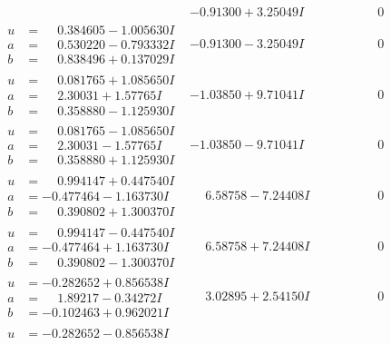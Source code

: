 \documentclass[1p]{elsarticle_modified}
\theoremstyle{definition}
\begin{document}
$$\begin{array}{c|c|c}
 & -0.91300 + 3.25049 I & \phantom{-0.000000 } 0 \\ \hline\begin{aligned}
u &= \phantom{-}0.384605 - 1.005630 I \\
a &= \phantom{-}0.530220 - 0.793332 I \\
b &= \phantom{-}0.838496 + 0.137029 I\end{aligned}
 & -0.91300 - 3.25049 I & \phantom{-0.000000 } 0 \\ \hline\begin{aligned}
u &= \phantom{-}0.081765 + 1.085650 I \\
a &= \phantom{-}2.30031 + 1.57765 I \\
b &= \phantom{-}0.358880 - 1.125930 I\end{aligned}
 & -1.03850 + 9.71041 I & \phantom{-0.000000 } 0 \\ \hline\begin{aligned}
u &= \phantom{-}0.081765 - 1.085650 I \\
a &= \phantom{-}2.30031 - 1.57765 I \\
b &= \phantom{-}0.358880 + 1.125930 I\end{aligned}
 & -1.03850 - 9.71041 I & \phantom{-0.000000 } 0 \\ \hline\begin{aligned}
u &= \phantom{-}0.994147 + 0.447540 I \\
a &= -0.477464 - 1.163730 I \\
b &= \phantom{-}0.390802 + 1.300370 I\end{aligned}
 & \phantom{-}6.58758 - 7.24408 I & \phantom{-0.000000 } 0 \\ \hline\begin{aligned}
u &= \phantom{-}0.994147 - 0.447540 I \\
a &= -0.477464 + 1.163730 I \\
b &= \phantom{-}0.390802 - 1.300370 I\end{aligned}
 & \phantom{-}6.58758 + 7.24408 I & \phantom{-0.000000 } 0 \\ \hline\begin{aligned}
u &= -0.282652 + 0.856538 I \\
a &= \phantom{-}1.89217 - 0.34272 I \\
b &= -0.102463 + 0.962021 I\end{aligned}
 & \phantom{-}3.02895 + 2.54150 I & \phantom{-0.000000 } 0 \\ \hline\begin{aligned}
u &= -0.282652 - 0.856538 I \\

\end{aligned}
\end{array}$$
\end{document}
